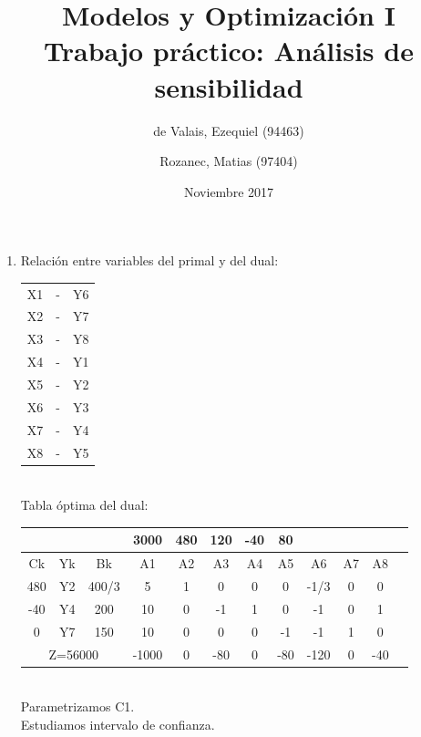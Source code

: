 \documentclass{article}
\begin{document}
\title{Modelos y Optimizaci\'on I\\ \large{Trabajo pr\'actico: An\'alisis de sensibilidad}}
\author{de Valais, Ezequiel (94463)\and Rozanec, Matias (97404)}
\date{Noviembre 2017}
\maketitle
\newpage


\newpage

\begin{enumerate}
	\item Relaci\'on entre variables del primal y del dual:\\
		\begin{tabular}{c c c}
			X1 & - & Y6 \\
			X2 & - & Y7 \\
			X3 & - & Y8 \\
			X4 & - & Y1 \\
			X5 & - & Y2 \\
			X6 & - & Y3 \\
			X7 & - & Y4 \\
			X8 & - & Y5 \\
		\end{tabular}
		\\
		Tabla \'optima del dual:\\
		\begin{tabular}{|c  c  c | c  c  c  c  c  c  c  c | c |}
			\hline
			 \multicolumn{3}{|c|}{} & 3000 & 480 & 120 & -40 & 80 & & &\\ \hline
			 Ck & Yk & Bk & A1 & A2 & A3 & A4 & A5 & A6 & A7 & A8\\ \hline 
			 480 & Y2 & 400/3 & 5 & 1 & 0 & 0 & 0 & -1/3 & 0 & 0\\
			 -40 & Y4 & 200 & 10 & 0 & -1 & 1 & 0 & -1 & 0 & 1\\
			 0 & Y7 & 150 & 10 & 0 & 0 & 0 & -1 & -1 & 1 & 0\\ \hline
			 \multicolumn{3}{|c|}{Z=56000} & -1000 & 0 & -80 & 0 & -80 & -120 & 0 & -40\\ \hline
		\end{tabular}
		\medskip\\
		Parametrizamos C1.\\
		Estudiamos intervalo de confianza.

\end{enumerate}
\end{document}
